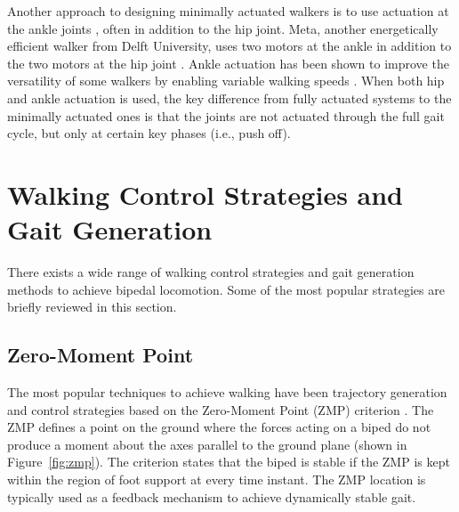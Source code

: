 Another approach to designing minimally actuated walkers is to use actuation at the ankle joints \cite{Collins:2005vp,Kuo:2002wk,Hobbelen2008Ankle,Hobbelen2008Controlling}, often in addition to the hip joint. Meta, another energetically efficient walker from Delft University, uses two motors at the ankle in addition to the two motors at the hip joint \cite{Hobbelen2008Ankle}. Ankle actuation has been shown to improve the versatility of some walkers by enabling variable walking speeds \cite{Hobbelen2008Controlling}. When both hip and ankle actuation is used, the key difference from fully actuated systems to the minimally actuated ones is that the joints are not actuated through the full gait cycle, but only at certain key phases (i.e., push off).









\section{Walking Control Strategies and Gait Generation} %
\label{sec:related_control_strategies}
There exists a wide range of walking control strategies and gait generation methods to achieve bipedal locomotion. Some of the most popular strategies are briefly reviewed in this section.


\subsection{Zero-Moment Point} %
\label{sub:related_zero_moment_point}
The most popular techniques to achieve walking have been trajectory generation and control strategies based on the Zero-Moment Point (ZMP) criterion \cite{Vukobratovic:2004wy}. The ZMP defines a point on the ground where the forces acting on a biped do not produce a moment about the axes parallel to the ground plane (shown in Figure~\ref{fig:zmp}). The criterion states that the biped is stable if the ZMP is kept within the region of foot support at every time instant. The ZMP location is typically used as a feedback mechanism to achieve dynamically stable gait.  

